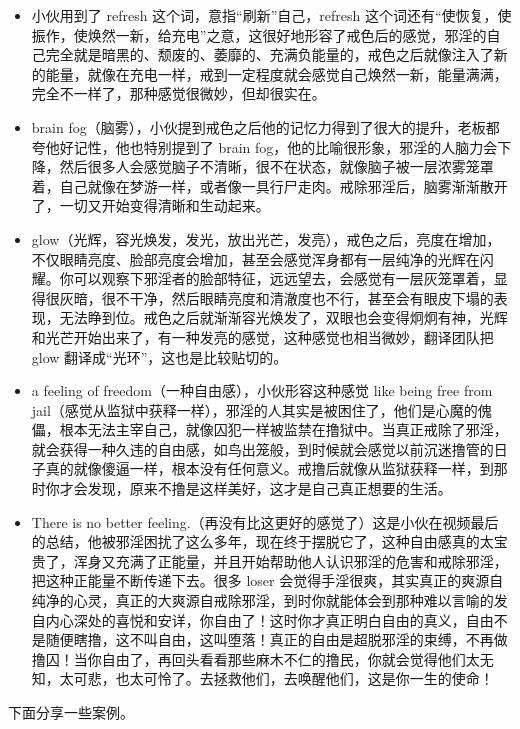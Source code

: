 \begin{itemize}
    \item 小伙用到了 refresh 这个词，意指“刷新”自己，refresh 这个词还有“使恢复，使振作，使焕然一新，给充电”之意，这很好地形容了戒色后的感觉，邪淫的自己完全就是暗黑的、颓废的、萎靡的、充满负能量的，戒色之后就像注入了新的能量，就像在充电一样，戒到一定程度就会感觉自己焕然一新，能量满满，完全不一样了，那种感觉很微妙，但却很实在。
    \item brain fog（脑雾），小伙提到戒色之后他的记忆力得到了很大的提升，老板都夸他好记性，他也特别提到了 brain fog，他的比喻很形象，邪淫的人脑力会下降，然后很多人会感觉脑子不清晰，很不在状态，就像脑子被一层浓雾笼罩着，自己就像在梦游一样，或者像一具行尸走肉。戒除邪淫后，脑雾渐渐散开了，一切又开始变得清晰和生动起来。
    \item glow（光辉，容光焕发，发光，放出光芒，发亮），戒色之后，亮度在增加，不仅眼睛亮度、脸部亮度会增加，甚至会感觉浑身都有一层纯净的光辉在闪耀。你可以观察下邪淫者的脸部特征，远远望去，会感觉有一层灰笼罩着，显得很灰暗，很不干净，然后眼睛亮度和清澈度也不行，甚至会有眼皮下塌的表现，无法睁到位。戒色之后就渐渐容光焕发了，双眼也会变得炯炯有神，光辉和光芒开始出来了，有一种发亮的感觉，这种感觉也相当微妙，翻译团队把 glow 翻译成“光环”，这也是比较贴切的。
    \item a feeling of freedom（一种自由感），小伙形容这种感觉 like being free from jail（感觉从监狱中获释一样），邪淫的人其实是被困住了，他们是心魔的傀儡，根本无法主宰自己，就像囚犯一样被监禁在撸狱中。当真正戒除了邪淫，就会获得一种久违的自由感，如鸟出笼般，到时候就会感觉以前沉迷撸管的日子真的就像傻逼一样，根本没有任何意义。戒撸后就像从监狱获释一样，到那时你才会发现，原来不撸是这样美好，这才是自己真正想要的生活。
    \item There is no better feeling.（再没有比这更好的感觉了）这是小伙在视频最后的总结，他被邪淫困扰了这么多年，现在终于摆脱它了，这种自由感真的太宝贵了，浑身又充满了正能量，并且开始帮助他人认识邪淫的危害和戒除邪淫，把这种正能量不断传递下去。很多 loser 会觉得手淫很爽，其实真正的爽源自纯净的心灵，真正的大爽源自戒除邪淫，到时你就能体会到那种难以言喻的发自内心深处的喜悦和安详，你自由了！这时你才真正明白自由的真义，自由不是随便瞎撸，这不叫自由，这叫堕落！真正的自由是超脱邪淫的束缚，不再做撸囚！当你自由了，再回头看看那些麻木不仁的撸民，你就会觉得他们太无知，太可悲，也太可怜了。去拯救他们，去唤醒他们，这是你一生的使命！
\end{itemize}

下面分享一些案例。

